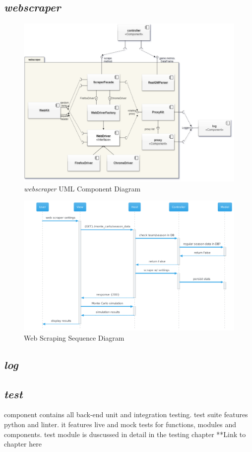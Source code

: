 \documentclass{thesis-ekf}
\theoremstyle{definition}
\theoremstyle{remark}
\begin{document}
\subsection{\emph{webscraper}}

\begin{figure}[th!]
	\centering
	\includegraphics[width=0.7\linewidth]{img/component/component_webscraper}
	\caption{\emph{webscraper} UML Component Diagram}
	\label{img-webscraper-component}
\end{figure}

\begin{figure}[th!]
	\centering
	\includegraphics[width=0.85\linewidth]{img/sequence/scraping/scraping_caerilian}
	\caption{Web Scraping Sequence Diagram}
	\label{img-scraping-sequence}
\end{figure}

\subsection{\emph{log}}

\subsection{\emph{test}}
component contains all back-end unit and integration testing. test suite features python and linter. it features live and mock tests for functions, modules and components. test module is duscussed in detail in the testing chapter **Link to chapter here
\end{document}
